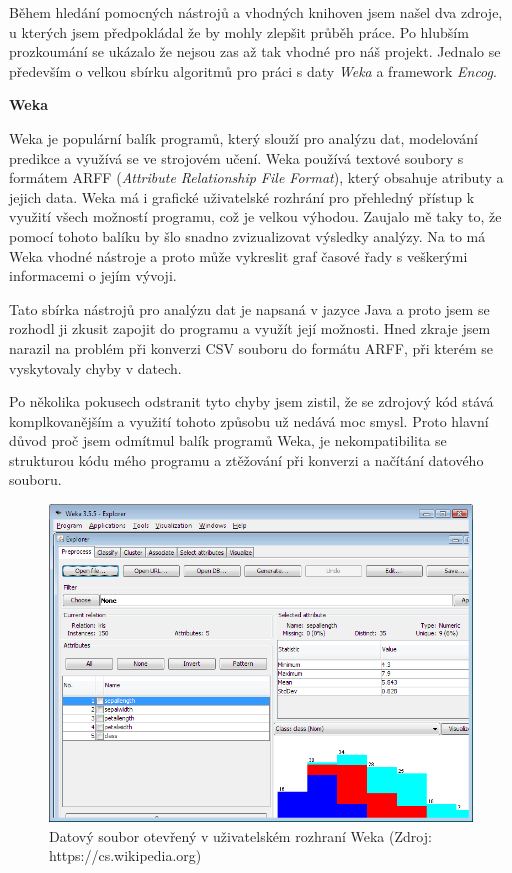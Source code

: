 \documentclass[a4paper,12pt,twoside]{scrreprt}
\begin{document}
Během hledání pomocných nástrojů a vhodných knihoven jsem našel dva zdroje, u kterých jsem předpokládal že by mohly zlepšit průběh práce. Po hlubším \\ prozkoumání se ukázalo že nejsou zas až tak vhodné pro náš projekt. Jednalo se především o velkou sbírku algoritmů pro práci s daty \textit{Weka} a framework \textit{Encog}.  
\vspace*{0.5cm}

\textbf{Weka}

Weka je populární balík programů, který slouží pro analýzu dat, modelování predikce a využívá se ve strojovém učení. Weka používá textové soubory s formátem ARFF (\textit{Attribute Relationship File Format}), který obsahuje atributy a jejich data. Weka má i grafické uživatelské rozhrání pro přehledný přístup k využití všech možností programu, což je velkou výhodou. Zaujalo mě taky to, že pomocí tohoto balíku by šlo snadno zvizualizovat výsledky analýzy. Na to má Weka vhodné nástroje a  proto může vykreslit graf časové řady s veškerými informacemi o jejím vývoji.

Tato sbírka nástrojů pro analýzu dat je napsaná v jazyce Java a proto jsem se rozhodl ji zkusit zapojit do programu a využít její možnosti. Hned zkraje jsem narazil na problém při konverzi CSV souboru do formátu ARFF, při kterém se vyskytovaly chyby v datech.

Po několika pokusech odstranit tyto chyby jsem zistil, že se zdrojový kód stává komplkovanějším a využití tohoto způsobu už nedává moc smysl. Proto hlavní důvod proč jsem odmítmul balík programů Weka, je nekompatibilita se strukturou kódu mého programu a ztěžování při konverzi a načítání datového souboru.            

\begin{figure}[h]
  \centering
  \includegraphics[width=15cm]{pictures/weka.png}
  \caption{Datový soubor otevřený v uživatelském rozhraní Weka \newline(Zdroj: https://cs.wikipedia.org)}
  \label{fig:weka}
\end{figure}
\end{document}
